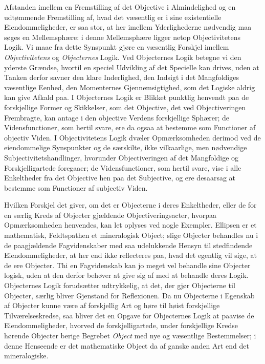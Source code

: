 \documentclass[12pt]{book}
\newcommand{\opage}[1]{\marginnote{\footnotesize\textit{[#1]}}}
\begin{document}
Afstanden imellem en Fremstilling af det Objective i Almindelighed og en udtømmende Fremstilling af,
hvad det væsentlig er i sine existentielle Eiendommeligheder, er saa stor, at her imellem
Yderlighederne nødvendig maa søges en Mellemsphære: i denne Mellemsphære ligger netop Objectivitetens
Logik. Vi maae fra dette Synspunkt gjøre en væsentlig Forskjel imellem \emph{Objectivitetens} og
\emph{Objecternes} Logik. Ved Objecternes Logik betegne vi den yderste Grændse, hvortil en speciel
Udvikling af det Specielle kan drives, uden at Tanken derfor savner den klare Inderlighed, den Indsigt
i det Mangfoldiges væsentlige Eenhed, den Momenternes Gjennemsigtighed, som det Logiske aldrig kan give
Afkald paa. I Objecternes Logik er Blikket punktlig henvendt paa de forskjellige Former og Skikkelser,
som det Objective, det ved Objectiveringen Frembragte, kan antage i den objective Verdens forskjellige
Sphærer; de Vidensfunctioner, som hertil svare, ere da ogsaa at bestemme som Functioner af objectiv
Viden. I Objectivitetens Logik dvæler Opmærksomheden derimod ved de eiendommelige Synspunkter og de
særskilte, ikke vilkaarlige, men nødvendige Subjectivitetshandlinger, hvorunder Objectiveringen af det
Mangfoldige og Forskjelligartede foregaaer; de Vidensfunctioner, som hertil svare, vise i alle
Enkeltheder fra det Objective hen paa det Subjective, og ere desaarsag at bestemme som Functioner af
subjectiv Viden.

Hvilken Forskjel det giver, om det er Objecterne i deres Enkeltheder, eller de for en særlig Kreds af
Objecter gjældende
\opage{266} Objectiveringsacter, hvorpaa Opmærksomheden henvendes, kan let oplyses ved nogle Exempler. Ellipsen er
et mathematisk, Feldtspathen et mineralogisk Object; slige Objecter behandles nu i de paagjældende
Fagvidenskaber med saa udelukkende Hensyn til stedfindende Eiendommeligheder, at her end ikke
reflecteres paa, hvad det egentlig vil sige, at de ere Objecter. Thi en Fagvidenskab kan jo meget vel
behandle sine Objecter logisk, uden at den derfor behøver at give sig af med at behandle deres Logik.
Objecternes Logik forudsætter udtrykkelig, at det, der gjør Objecterne til Objecter, særlig bliver
Gjenstand for Reflexionen. Da nu Objecterne i Egenskab af Objecter kunne være af forskjellig Art og
høre til høist forskjellige Tilværelseskredse, saa bliver det en Opgave for Objecternes Logik at
paavise de Eiendommeligheder, hvorved de forskjelligartede, under forskjellige Kredse hørende Objecter
berige Begrebet \emph{Object} med nye og væsentlige Bestemmelser; i denne Henseende er det mathematiske
Object da af ganske anden Art end det mineralogiske.
\end{document}

